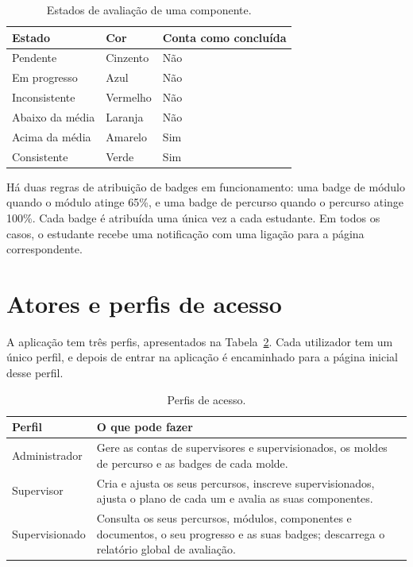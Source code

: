 \begin{table}[H]
    \centering
    \small
    \begin{tabularx}{\linewidth}{llX}
        \toprule
        \textbf{Estado} & \textbf{Cor} & \textbf{Conta como concluída} \\
        \midrule
        Pendente & Cinzento & Não \\
        Em progresso & Azul & Não \\
        Inconsistente & Vermelho & Não \\
        Abaixo da média & Laranja & Não \\
        Acima da média & Amarelo & Sim \\
        Consistente & Verde & Sim \\
        \bottomrule
    \end{tabularx}
    \caption{Estados de avaliação de uma componente.}
    \label{tab:estados}
\end{table}

Há duas regras de atribuição de badges em funcionamento: uma badge de módulo quando o módulo atinge 65\%, e uma badge de percurso quando o percurso atinge 100\%. Cada badge é atribuída uma única vez a cada estudante. Em todos os casos, o estudante recebe uma notificação com uma ligação para a página correspondente.

\section{Atores e perfis de acesso}

A aplicação tem três perfis, apresentados na Tabela~\ref{tab:perfis}. Cada utilizador tem um único perfil, e depois de entrar na aplicação é encaminhado para a página inicial desse perfil.

\begin{table}[H]
    \centering
    \small
    \begin{tabularx}{\linewidth}{lX}
        \toprule
        \textbf{Perfil} & \textbf{O que pode fazer} \\
        \midrule
        Administrador & Gere as contas de supervisores e supervisionados, os moldes de percurso e as badges de cada molde. \\
        \midrule
        Supervisor & Cria e ajusta os seus percursos, inscreve supervisionados, ajusta o plano de cada um e avalia as suas componentes. \\
        \midrule
        Supervisionado & Consulta os seus percursos, módulos, componentes e documentos, o seu progresso e as suas badges; descarrega o relatório global de avaliação. \\
        \bottomrule
    \end{tabularx}
    \caption{Perfis de acesso.}
    \label{tab:perfis}
\end{table}

